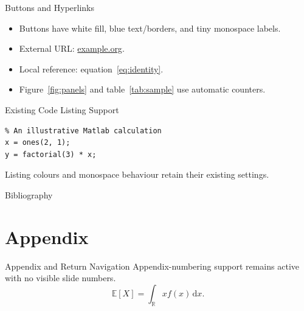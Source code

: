 \documentclass[\DesignTestOptions,xcolor={svgnames}]{beamer}
\begin{document}
\begin{frame}[label=buttons]{Buttons and Hyperlinks}
  \hyperlink{appendix-proof}{}\quad
  \hyperlink{appendix-proof}{}
  \begin{itemize}
    \item Buttons have white fill, blue text/borders, and tiny monospace labels.
    \item External URL: \href{https://example.org}{example.org}.
    \item Local reference: equation~\eqref{eq:identity}.
    \item Figure~\ref{fig:panels} and table~\ref{tab:sample} use automatic counters.
  \end{itemize}
\end{frame}

\begin{frame}[fragile]{Existing Code Listing Support}
\begin{lstlisting}
% An illustrative Matlab calculation
x = ones(2, 1);
y = factorial(3) * x;
\end{lstlisting}
  Listing colours and monospace behaviour retain their existing settings.
\end{frame}

\begin{frame}[allowframebreaks]{Bibliography}
  \printbibliography[heading=none]
\end{frame}

\appendix
\section{Appendix}
\begin{frame}[label=appendix-proof]{Appendix and Return Navigation}
  Appendix-numbering support remains active with no visible slide numbers.
  \begin{equation}
    \mathbb{E}[X]=\int_{\mathbb{R}} x f(x)\,\mathrm{d}x.
  \end{equation}
  \hyperlink{buttons}{}
\end{frame}
\end{document}
